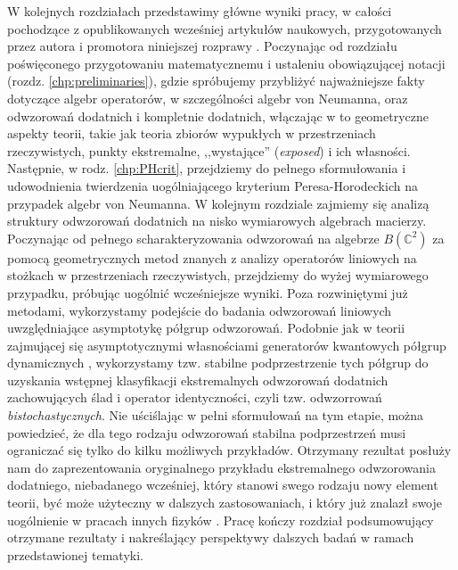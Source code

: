 W kolejnych rozdziałach przedstawimy główne wyniki pracy,
w całości pochodzące z opublikowanych wcześniej artykułów naukowych,
przygotowanych przez autora i promotora niniejszej rozprawy
\cite{miller2014horodeckis,miller2015stable,miller2015topology}.
Poczynając od rozdziału poświęconego przygotowaniu matematycznemu i ustaleniu
obowiązującej notacji (rozdz. \ref{chp:preliminaries}),
gdzie spróbujemy przybliżyć najważniejsze fakty dotyczące algebr operatorów,
w szczególności algebr von Neumanna,
oraz odwzorowań dodatnich i kompletnie dodatnich,
włączając w to geometryczne aspekty teorii,
takie jak teoria zbiorów wypukłych w przestrzeniach rzeczywistych,
punkty ekstremalne, ,,wystające'' (\emph{exposed}) i ich własności.
Następnie,
w rodz. \ref{chp:PHcrit},
przejdziemy do pełnego sformułowania i udowodnienia twierdzenia
uogólniającego kryterium Peresa-Horodeckich na przypadek algebr von Neumanna.
W kolejnym rozdziale zajmiemy się analizą struktury odwzorowań dodatnich na
nisko wymiarowych algebrach macierzy.
Poczynając od pełnego scharakteryzowania odwzorowań na algebrze
$B(\mathbb{C}^{2})$ za pomocą geometrycznych metod znanych z analizy
operatorów liniowych na stożkach w przestrzeniach rzeczywistych,
przejdziemy do wyżej wymiarowego przypadku,
próbując uogólnić wcześniejsze wyniki.
Poza rozwiniętymi już metodami,
wykorzystamy podejście do badania odwzorowań
liniowych uwzględniające asymptotykę półgrup odwzorowań.
Podobnie jak w teorii
zajmującej się asymptotycznymi własnościami generatorów kwantowych półgrup
dynamicznych \cite{olkiewicz1999environment},
wykorzystamy tzw. stabilne podprzestrzenie tych półgrup do uzyskania
wstępnej klasyfikacji ekstremalnych odwzorowań dodatnich 
zachowujących ślad i operator identyczności,
czyli tzw. odwzorrowań \emph{bistochastycznych}.
Nie uściślając w pełni sformułowań na tym etapie,
można powiedzieć,
że dla tego rodzaju odwzorowań stabilna podprzestrzeń musi ograniczać się
tylko do kilku możliwych przykładów.
Otrzymany rezultat posłuży nam do zaprezentowania oryginalnego przykładu
ekstremalnego odwzorowania dodatniego, niebadanego wcześniej,
który stanowi swego rodzaju nowy element teorii,
być może użyteczny w dalszych zastosowaniach,
i który już znalazł swoje uogólnienie w pracach innych fizyków
\cite{rutkowski2015class}.
Pracę kończy rozdział podsumowujący otrzymane rezultaty i nakreślający
perspektywy dalszych badań w ramach przedstawionej tematyki.

